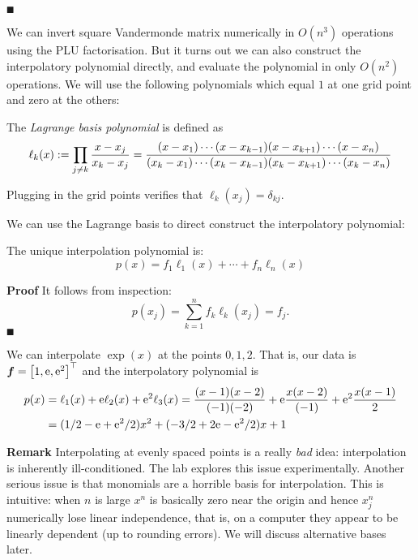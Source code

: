 \ensuremath{\QED}

We can invert square Vandermonde matrix numerically in $O(n^3)$ operations using the PLU factorisation. But it turns out we can also construct the interpolatory polynomial directly, and evaluate the polynomial in only $O(n^2)$ operations. We will use the following polynomials which equal $1$ at one grid point and zero at the others:

\begin{definition} The \emph{Lagrange basis polynomial} is defined as
\[
\ensuremath{\ell}_k(x) := \ensuremath{\prod}_{j \ensuremath{\neq} k} {x-x_j \over x_k - x_j} =  {(x-x_1) \ensuremath{\cdots}(x-x_{k-1})(x-x_{k+1}) \ensuremath{\cdots} (x-x_n) \over (x_k - x_1) \ensuremath{\cdots} (x_k - x_{k-1}) (x_k - x_{k+1}) \ensuremath{\cdots} (x_k - x_n)}
\]
\end{definition}

Plugging in the grid points verifies that $\ensuremath{\ell}_k(x_j) = \ensuremath{\delta}_{kj}$.

We can use the Lagrange basis to direct construct the interpolatory polynomial:

\begin{theorem} The unique interpolation polynomial is:
\[
p(x) = f_1 \ensuremath{\ell}_1(x) + \ensuremath{\cdots} + f_n \ensuremath{\ell}_n(x)
\]
\end{theorem}
\textbf{Proof} It follows from inspection:
\[
p(x_j) = \ensuremath{\sum}_{k=1}^n f_k \ensuremath{\ell}_k(x_j) = f_j.
\]
\ensuremath{\QED}

\begin{example} We can interpolate $\exp(x)$ at the points $0,1,2$. That is, our data is $\ensuremath{\bm{\f}} = \vectt[1, {\rm e},{\rm e}^2]$ and the interpolatory polynomial is
\begin{align*}
p(x) &= \ensuremath{\ell}_1(x) + {\rm e} \ensuremath{\ell}_2(x) + {\rm e}^2 \ensuremath{\ell}_3(x) =
{(x - 1) (x-2) \over (-1)(-2)} + {\rm e} {x (x-2) \over (-1)} +
{\rm e}^2 {x (x-1) \over 2} \\
&= (1/2 - {\rm e} +{\rm e}^2/2)x^2 + (-3/2 + 2 {\rm e}  - {\rm e}^2 /2) x + 1
\end{align*}
\end{example}

\textbf{Remark} Interpolating at evenly spaced points is a really \emph{bad} idea: interpolation is inherently ill-conditioned. The lab  explores this issue experimentally. Another serious issue is that monomials are a horrible basis for interpolation.  This is intuitive: when $n$ is large $x^n$ is basically zero near the origin and hence $x_j^n$ numerically lose linear independence, that is, on a computer they appear to be linearly dependent (up to rounding errors).  We will discuss alternative bases later.

